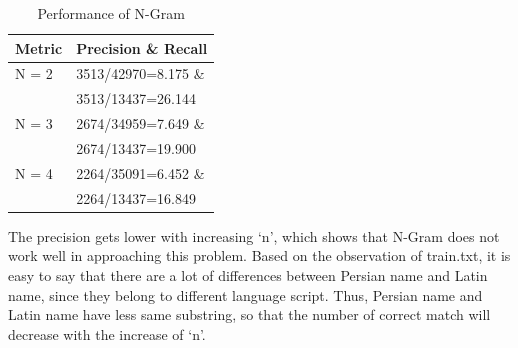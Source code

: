 \documentclass[11pt]{article}
\begin{document}
\begin{table}[h]
\begin{center}
\begin{tabular}{|l|l|}

      \hline
      Metric & Precision \& Recall \\
      \hline\hline
      N = 2 & 3513/42970=8.175 \&\\
            & 3513/13437=26.144 \\
      N = 3 & 2674/34959=7.649 \&\\
            & 2674/13437=19.900 \\
      N = 4 & 2264/35091=6.452 \&\\
            & 2264/13437=16.849 \\
      \hline

\end{tabular}
\caption{Performance of N-Gram}\label{table5}
 \end{center}
\end{table}
The precision gets lower with increasing `n', which shows that N-Gram does not work well in approaching this problem. Based on the observation of train.txt, it is easy to say that there are a lot of differences between Persian name and Latin name, since they belong to different language script. Thus, Persian name and Latin name have less same substring, so that the number of correct match will decrease with the increase of ‘n’.









\end{document}
